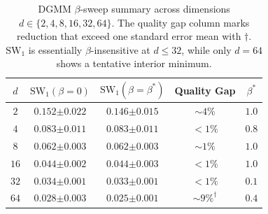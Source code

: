 \begin{table}[!t]
    \centering
    \caption{DGMM $\beta$-sweep summary across dimensions $d\!\in\!\{2,4,8,16,32,64\}$. The quality gap column marks reduction that exceed one standard error mean with $\dagger$. $\mathrm{SW}_{1}$ is essentially $\beta$-insensitive at $d\!\le\!32$, while only $d\!=\!64$ shows a tentative interior minimum.}
    \label{tab: dgmm-beta-summary}
    \begin{tabular}{@{}c|cccc@{}}
        \toprule
        $d$ & $\mathrm{SW}_{1}(\beta\!=\!0)$ & $\mathrm{SW}_{1}(\beta=\beta^{\ast})$ & \textbf{Quality Gap} & $\beta^{\ast}$ \\
        \midrule
        $2$  & $0.152{\scriptstyle\pm0.022}$ & $0.146{\scriptstyle\pm0.015}$ & $\sim\!4\%$  & $1.0$ \\
        $4$  & $0.083{\scriptstyle\pm0.011}$ & $0.083{\scriptstyle\pm0.011}$ & $<\!1\%$    & $0.8$ \\
        $8$  & $0.062{\scriptstyle\pm0.003}$ & $0.062{\scriptstyle\pm0.003}$ & $\sim\!1\%$ & $1.0$ \\
        $16$ & $0.044{\scriptstyle\pm0.002}$ & $0.044{\scriptstyle\pm0.003}$ & $<\!1\%$    & $1.0$ \\
        $32$ & $0.034{\scriptstyle\pm0.001}$ & $0.033{\scriptstyle\pm0.001}$ & $<\!1\%$    & $0.1$ \\
        $64$ & $0.028{\scriptstyle\pm0.003}$ & $0.025{\scriptstyle\pm0.001}$ & $\sim\!9\%^{\dagger}$ & $0.4$ \\
        \bottomrule
    \end{tabular}
\end{table}
